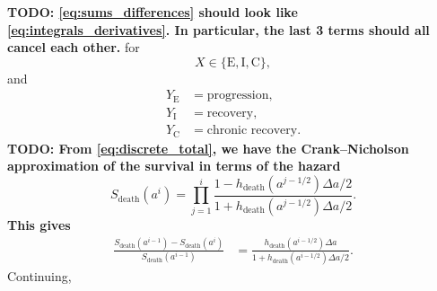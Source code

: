 \documentclass[12pt]{article}
\begin{document}
%
\textbf{TODO: \eqref{eq:sums_differences} should look like
  \eqref{eq:integrals_derivatives}. In particular, the last 3 terms should
  all cancel each other.}
%
for
\begin{equation}
  X \in \{\mathrm{E}, \mathrm{I}, \mathrm{C}\},
\end{equation}
and
\begin{equation}
  \begin{split}
    Y_{\mathrm{E}} &= \text{progression},
    \\
    Y_{\mathrm{I}} &= \text{recovery},
    \\
    Y_{\mathrm{C}} &= \text{chronic recovery}.
  \end{split}
\end{equation}
%
\textbf{TODO: From \eqref{eq:discrete_total}, we have the
  Crank--Nicholson approximation of the survival in terms of the
  hazard}
\begin{displaymath}
  S_{\text{death}}(a^i)
  = \prod_{j = 1}^i \frac{
    1 - h_{\text{death}}(a^{j - 1 / 2}) \Delta a / 2
  }{
    1 + h_{\text{death}}(a^{j - 1 / 2}) \Delta a / 2
  }.
\end{displaymath}
\textbf{This gives}
\begin{displaymath}
  \begin{split}
    \frac{
      S_{\text{death}}(a^{i - 1}) - S_{\text{death}}(a^i)
    }{
      S_{\text{death}}(a^{i - 1})
    }
    &= \frac{
      h_{\text{death}}(a^{i - 1 / 2}) \Delta a
    }{
      1 + h_{\text{death}}(a^{i - 1 / 2}) \Delta a / 2
    }.
  \end{split}
\end{displaymath}
%
Continuing,
\end{document}
